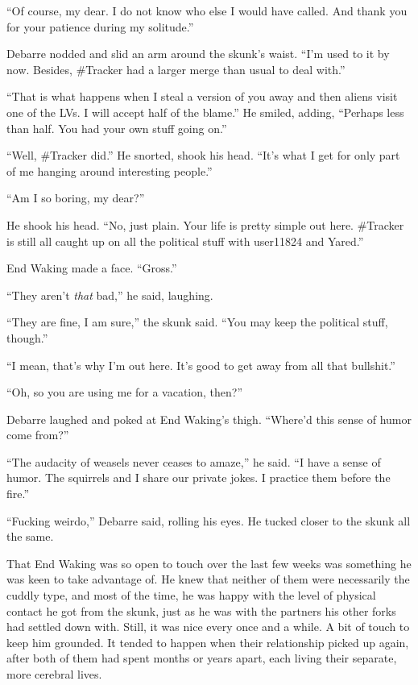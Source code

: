``Of course, my dear. I do not know who else I would have called. And thank you for your patience during my solitude.''

Debarre nodded and slid an arm around the skunk's waist. ``I'm used to it by now. Besides, \#Tracker had a larger merge than usual to deal with.''

``That is what happens when I steal a version of you away and then aliens visit one of the LVs. I will accept half of the blame.'' He smiled, adding, ``Perhaps less than half. You had your own stuff going on.''

``Well, \#Tracker did.'' He snorted, shook his head. ``It's what I get for only part of me hanging around interesting people.''

``Am I so boring, my dear?''

He shook his head. ``No, just plain. Your life is pretty simple out here. \#Tracker is still all caught up on all the political stuff with user11824 and Yared.''

End Waking made a face. ``Gross.''

``They aren't \emph{that} bad,'' he said, laughing.

``They are fine, I am sure,'' the skunk said. ``You may keep the political stuff, though.''

``I mean, that's why I'm out here. It's good to get away from all that bullshit.''

``Oh, so you are using me for a vacation, then?''

Debarre laughed and poked at End Waking's thigh. ``Where'd this sense of humor come from?''

``The audacity of weasels never ceases to amaze,'' he said. ``I have a sense of humor. The squirrels and I share our private jokes. I practice them before the fire.''

``Fucking weirdo,'' Debarre said, rolling his eyes. He tucked closer to the skunk all the same.

That End Waking was so open to touch over the last few weeks was something he was keen to take advantage of. He knew that neither of them were necessarily the cuddly type, and most of the time, he was happy with the level of physical contact he got from the skunk, just as he was with the partners his other forks had settled down with. Still, it was nice every once and a while. A bit of touch to keep him grounded. It tended to happen when their relationship picked up again, after both of them had spent months or years apart, each living their separate, more cerebral lives.

